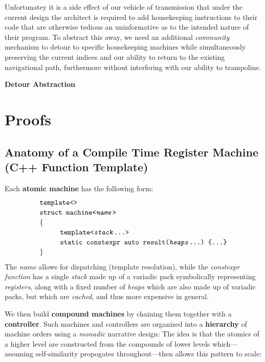 \documentclass[twoside]{article}
\newcommand{\strong}[1]{{\bfseries #1}}
\newcommand{\tab}[1][1.125cm]{\hspace{#1}}
\begin{document}
Unfortunatey it is a side effect of our vehicle of transmission that under the current design the architect
is required to add housekeeping instructions to their code that are otherwise tedious an uninformative as
to the intended nature of their program. To abstract this away, we need an additional \emph{community}
mechanism to detour to specific housekeeping machines while simultaneously preserving the current indices
and our ability to return to the existing navigational path, furthermore without interfering with our
ability to trampoline.

\strong{Detour Abstraction}

\section*{Proofs}

\subsection*{Anatomy of a Compile Time Register Machine (C++ Function Template)}

\noindent Each \strong{atomic machine} has the following form:
$$ \def\arraystretch{1.15}
\tab[0cm] \begin{array}{l}
\texttt{template<>}									\\
\texttt{struct machine<\emph{name}>}							\\
\{											\\
\tab[1cm]\texttt{template<\emph{stack}\ldots>}						\\
\tab[1cm]\texttt{static constexpr auto result(\emph{heaps}\ldots)\ \{\ldots\}}		\\
\}
\end{array} $$
The \emph{name} allows for dispatching (template resolution), while the \emph{constexpr function}
has a single \emph{stack} made up of a variadic pack symbolically representing \emph{registers},
along with a fixed number of \emph{heaps} which are also made up of variadic packs, but which
are \emph{cached}, and thus more expensive in general.

We then build \strong{compound machines} by chaining them together with a \strong{controller}.
Such machines and controllers are organized into a \strong{hierarchy} of machine orders using
a \emph{monadic} narrative design: The idea is that the atomics of a higher level are constructed
from the compounds of lower levels which---assuming self-similarity propogates throughout---then
allows this pattern to scale:
\end{document}

